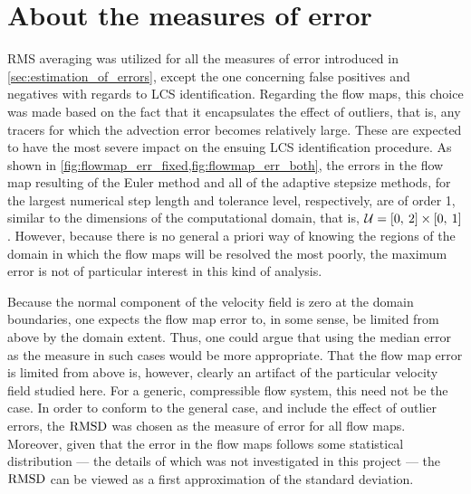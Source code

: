 \section{About the measures of error}
\label{sec:about_the_measures_of_error}

RMS averaging was utilized for all the measures of error introduced in
\cref{sec:estimation_of_errors}, except the one concerning false positives and
negatives with regards to LCS identification. Regarding the flow maps, this
choice was made based on the fact that it encapsulates the effect of outliers,
that is, any tracers for which the advection error becomes relatively large.
These are expected to have the most severe impact on the ensuing LCS
identification procedure. As shown in
\cref{fig:flowmap_err_fixed,fig:flowmap_err_both}, the errors in the flow map
resulting of the Euler method and all of the adaptive stepsize methods, for the
largest numerical step length and tolerance level, respectively, are of order 1,
similar to the dimensions of the computational domain, that is,
$\mathcal{U}=[0,\hspace{0.5ex}2]\times[0,\hspace{0.5ex}1]$. However, because
there is no general a priori way of knowing the regions of the domain in which
the flow maps will be resolved the most poorly, the maximum error is not of
particular interest in this kind of analysis.

Because the normal component of the velocity field is zero at the domain
boundaries, one expects the flow map error to, in some sense, be limited from
above by the domain extent. Thus, one could argue that using the median error
as the measure in such cases would be more appropriate. That the flow map
error is limited from above is, however, clearly an artifact of the particular
velocity field studied here. For a generic, compressible flow system, this need
not be the case. In order to conform to the general case, and include the effect
of outlier errors, the $\operatorname{RMSD}$ was chosen as the measure of error for all flow
maps. Moreover, given that the error in the flow maps follows some statistical
distribution --- the details of which was not investigated in this project ---
the $\operatorname{RMSD}$ can be viewed as a first approximation of the standard deviation.

